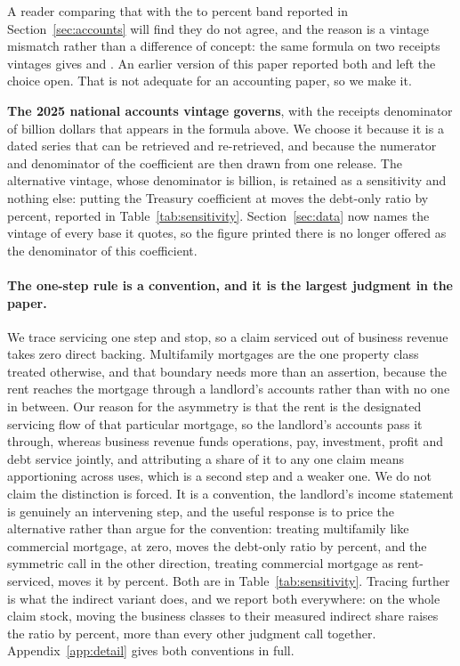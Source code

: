 A reader comparing that with the  to  percent band
reported in Section~\ref{sec:accounts} will find they do not agree, and the reason is a vintage
mismatch rather than a difference of concept: the same formula on two receipts vintages gives
 and . An earlier version of this paper reported both and
left the choice open. That is not adequate for an accounting paper, so we make it.

\textbf{The 2025 national accounts vintage governs}, with the receipts denominator of
 billion dollars that appears in the formula above. We choose it because it
is a dated series that can be retrieved and re-retrieved, and because the numerator and
denominator of the coefficient are then drawn from one release. The alternative vintage, whose
denominator is  billion, is retained as a sensitivity and nothing else:
putting the Treasury coefficient at  moves the debt-only ratio by
 percent, reported in Table~\ref{tab:sensitivity}.
Section~\ref{sec:data} now names the vintage of every base it quotes, so the figure printed there
is no longer offered as the denominator of this coefficient.

\paragraph{The one-step rule is a convention, and it is the largest judgment in the paper.} We
trace servicing one step and stop, so a claim serviced out of business revenue takes zero direct
backing. Multifamily mortgages are the one property class treated otherwise, and that boundary
needs more than an assertion, because the rent reaches the mortgage through a landlord's
accounts rather than with no one in between. Our reason for the asymmetry is that the rent is
the designated servicing flow of that particular mortgage, so the landlord's accounts pass it
through, whereas business revenue funds operations, pay, investment, profit and debt service
jointly, and attributing a share of it to any one claim means apportioning across uses, which
is a second step and a weaker one. We do not claim the distinction is forced. It is a
convention, the landlord's income statement is genuinely an intervening step, and the useful
response is to price the alternative rather than argue for the convention: treating
multifamily like commercial mortgage, at zero, moves the debt-only ratio by
 percent, and the symmetric call in the other direction,
treating commercial mortgage as rent-serviced, moves it by 
percent. Both are in Table~\ref{tab:sensitivity}. Tracing further is what the indirect
variant does, and we report both everywhere: on the whole claim stock, moving the business classes
to their measured indirect share raises the ratio by  percent,
more than every other judgment call together. Appendix~\ref{app:detail} gives both conventions in
full.

